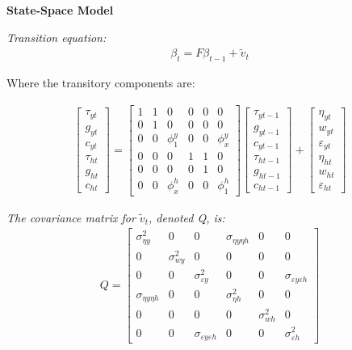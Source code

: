 \documentclass[fleqn]{article}
\begin{document}
\begin{outline}[enumerate]
\textbf{State-Space Model}

\textit{Transition equation:}
\begin{align}
\beta_t = F\beta_{t-1} + \tilde{v}_t
\end{align}

Where the transitory components are:

\begin{align}
\begin{bmatrix}
\tau_{yt}	\\
g_{yt}		\\
c_{yt}		\\
\tau_{ht}	\\
g_{ht}		\\
c_{ht}		
\end{bmatrix}
=
\begin{bmatrix}
1	& 1	& 0	& 0	& 0	& 0	\\
0	& 1	& 0	& 0	& 0	& 0	\\
0	& 0	& \phi^y_{1}	& 0 & 0 & \phi^y_x  \\
0	& 0	& 0	& 1	& 1	& 0 \\
0	& 0	& 0	& 0	& 1	& 0	\\
0	& 0	& \phi^h_{x}	& 0 & 0 & \phi^h_1
\end{bmatrix}
\begin{bmatrix}
\tau_{yt-1}	\\
g_{yt-1}		\\
c_{yt-1}		\\
\tau_{ht-1}	\\
g_{ht-1}		\\
c_{ht-1}		
\end{bmatrix}
+
\begin{bmatrix}
\eta_{yt}	\\
w_{yt}		\\
\varepsilon_{yt}	\\
\eta_{ht}	\\
w_{ht}		\\
\varepsilon_{ht}	
\end{bmatrix}
\end{align}

\textit{The covariance matrix for $\tilde{v}_t$, denoted Q, is: }
\begin{align}
Q = 
\begin{bmatrix}
\sigma^2_{\eta y}	& 0	 &0 & \sigma_{\eta y \eta h}	& 0	& 0	\\
0	& \sigma^2_{w y}	& 0	& 0	& 0	& 0	\\
0	&	0	& \sigma^2_{\varepsilon y}	& 0	& 0	& \sigma_{\varepsilon y \varepsilon h}	\\
\sigma_{\eta y \eta h}	& 0	& 0	& \sigma^2_{\eta h}	& 0	& 0	\\
0	& 0	& 0	& 0	& \sigma^2_{w h}	& 0	\\
0	&0	&\sigma_{\varepsilon y \varepsilon h}	& 0
	& 0	& \sigma^2_{\varepsilon h}	
\end{bmatrix}
\end{align}


\end{outline}
\end{document}
